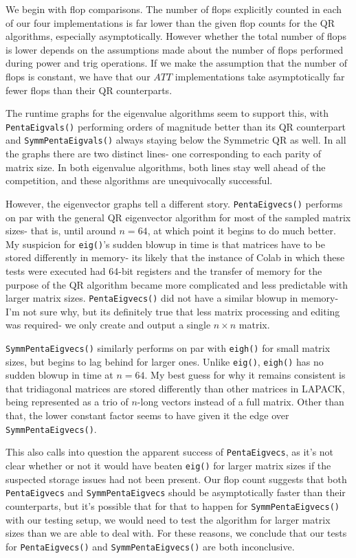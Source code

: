 \documentclass[10pt,twocolumn]{article}
\begin{document}
We begin with flop comparisons. The number of flops explicitly counted in each of our four implementations is far lower than the given flop counts for the QR algorithms, especially asymptotically. However whether the total number of flops is lower depends on the assumptions made about the number of flops performed during power and trig operations. If we make the assumption that the number of flops is constant, we have that our $ATT$ implementations take asymptotically far fewer flops than their QR counterparts. 

The runtime graphs for the eigenvalue algorithms seem to support this, with \verb|PentaEigvals()| performing orders of magnitude better than its QR counterpart and \verb|SymmPentaEigvals()| always staying below the Symmetric QR as well. In all the graphs there are two distinct lines- one corresponding to each parity of matrix size. In both eigenvalue algorithms, both lines stay well ahead of the competition, and these algorithms are unequivocally successful.

However, the eigenvector graphs tell a different story. \verb|PentaEigvecs()| performs on par with the general QR eigenvector algorithm for most of the sampled matrix sizes- that is, until around $n=64$, at which point it begins to do much better. My suspicion for \verb|eig()|'s sudden blowup in time is that matrices have to be stored differently in memory- its likely that the instance of Colab in which these tests were executed had 64-bit registers and the transfer of memory for the purpose of the QR algorithm became more complicated and less predictable with larger matrix sizes. \verb|PentaEigvecs()| did not have a similar blowup in memory- I'm not sure why, but its definitely true that less matrix processing and editing was required- we only create and output a single $n\times n$ matrix.

\verb|SymmPentaEigvecs()| similarly performs on par with \verb|eigh()| for small matrix sizes, but begins to lag behind for larger ones. Unlike \verb|eig()|, \verb|eigh()| has no sudden blowup in time at $n=64$. My best guess for why it remains consistent is that tridiagonal matrices are stored differently than other matrices in LAPACK, being represented as a trio of $n$-long vectors instead of a full matrix. Other than that, the lower constant factor seems to have given it the edge over \verb|SymmPentaEigvecs()|. 

This also calls into question the apparent success of \verb|PentaEigvecs|, as it's not clear whether or not it would have beaten \verb|eig()| for larger matrix sizes if the suspected storage issues had not been present. Our flop count suggests that both \verb|PentaEigvecs| and \verb|SymmPentaEigvecs| should be asymptotically faster than their counterparts, but it's possible that for that to happen for \verb|SymmPentaEigvecs()| with our testing setup, we would need to test the algorithm for larger matrix sizes than we are able to deal with. For these reasons, we conclude that our tests for \verb|PentaEigvecs()| and \verb|SymmPentaEigvecs()| are both inconclusive.
\end{document}
